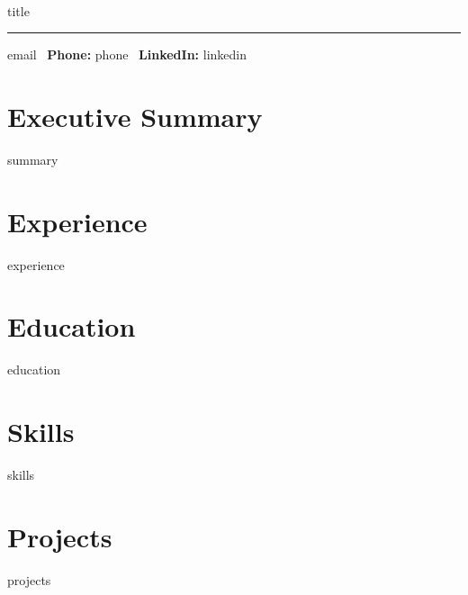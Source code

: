 \documentclass[11pt]{article}
\begin{document}
\pagestyle{empty}
\begin{center}
  {\colorbox{headerbg}{\parbox{0.9\linewidth}{\vspace{14pt}\\[4pt] {\color{headerfg} {title}}\\[10pt]}}}
\end{center}
\vspace{12pt}
\noindent\rule{\linewidth}{0.4pt}
\vspace{12pt}
 {email} \textbar\ {\textbf{Phone:}} {phone} \textbar\ {\textbf{LinkedIn:}} {linkedin}
\vspace{14pt}

\section*{Executive Summary}
{summary}

\section*{Experience}
{experience}

\section*{Education}
{education}

\section*{Skills}
{skills}

\section*{Projects}
{projects}
\end{document}
